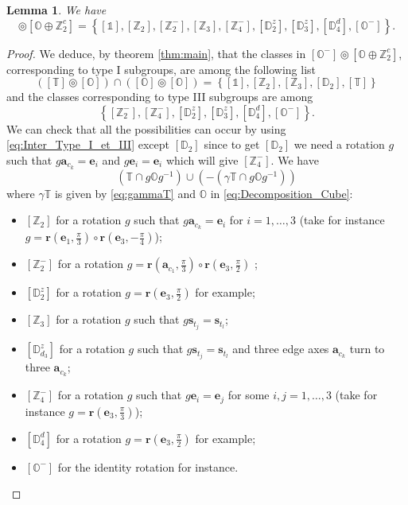 \documentclass[11pt,a4paper]{amsart}
\newtheorem{lem}[thm]{Lemma}
\theoremstyle{definition}
\newcommand{\ZZ}{\mathbb{Z}}                %
\newcommand{\octa}{\mathbb{O}}              %
\newcommand{\tetra}{\mathbb{T}}             %
\newcommand{\DD}{\mathbb{D}}                %
\newcommand{\1}{\mathds{1}}		            %
\newcommand{\ee}{\pmb{e}}                   %
\newcommand{\vR}{\mathbf{r}}
\newcommand{\set}[1]{\left\{#1\right\}}     %
\begin{document}
\begin{lem}
	We have
	\begin{equation*}
		 [\octa^-] \circledcirc [\octa \oplus \ZZ_2^c]=\set{[\1],[\ZZ_2],[\ZZ_2^-],[\ZZ_3],[\ZZ_4^-],[\DD_2^z],[\DD_3^z],[\DD_4^d],[\octa^-]}.
	\end{equation*}
\end{lem}


\begin{proof}
We deduce, by theorem \ref{thm:main}, that the classes in $[\octa^-]\circledcirc [\octa\oplus \ZZ_2^c]$, corresponding to type I subgroups, are among the following list
\begin{equation*}
	([\tetra]\circledcirc [\octa])\cap ([\octa]\circledcirc[\octa])=\set{[\1],[\ZZ_{2}],[\ZZ_{3}],[\DD_{2}],[\tetra]}
\end{equation*}
and the classes corresponding to type III subgroups are among
\begin{equation*}
	\set{[\ZZ_2^-],[\ZZ_4^-],[\DD_{2}^z],[\DD_{3}^z],[\DD_4^d],[\octa^-]}.
\end{equation*}
We can check that all the possibilities can occur by using \eqref{eq:Inter_Type_I_et_III} except $[\DD_2]$ since to get $[\DD_2]$ we need a rotation $g$ such that $g\pmb{a}_{c_k}=\ee_i$ and $g\ee_i=\ee_i$ which will give $[\ZZ_4^-]$.
We have
\begin{equation*}
	(\tetra\cap g \octa g^{-1})\cup (-(\gamma\tetra\cap g \octa g^{-1}))
\end{equation*}
where  $\gamma\tetra$ is given by \eqref{eq:gammaT} and $\octa$ in \eqref{eq:Decomposition_Cube}:

\begin{itemize}
	\item $[\ZZ_2]$ for a rotation $g$ such that $g\pmb{a}_{c_k}= \ee_i$ for $ i=1,\dotsc, 3$ (take for instance $g=\vR\left(\ee_1,\frac{\pi}{3}\right)\circ \vR\left(\ee_3,-\frac{\pi}{4}\right)$);
	\item $[\ZZ_{2}^-]$ for a rotation $g=\vR\left(\pmb{a}_{c_1},\frac{\pi}{3}\right)\circ \vR\left(\ee_3,\frac{\pi}{2}\right)$ ;
	\item $[\DD_2^z]$ for a rotation $g=\vR\left(\ee_3,\frac{\pi}{2} \right)$ for example;
	\item $[\ZZ_{3}]$ for a rotation $g$ such that $g\pmb{s}_{t_j}= \pmb{s}_{t_l}$;
	\item $[\DD_{d_3}^z]$ for a rotation $g$ such that $g\pmb{s}_{t_j}=\pmb{s}_{t_l}$ and three edge axes $\pmb{a}_{c_k}$ turn to three $\pmb{a}_{c_k}$;
	\item $[\ZZ_4^-]$ for a rotation $g$ such that $g\ee_i=\ee_j$ for some $i,j=1,\dotsc,3$ (take for instance $g=\vR\left(\ee_3,\frac{\pi}{3}\right)$);
	\item $[\DD_{4}^d]$ for a rotation $g=\vR\left(\ee_3,\frac{\pi}{2}\right)$ for example;
	\item $[\octa^-]$ for the identity rotation for instance.
\end{itemize}	
\end{proof}
\end{document}
